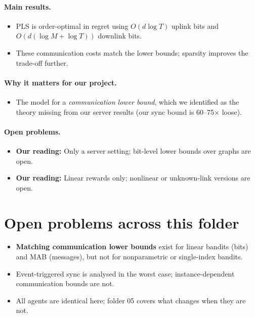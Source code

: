 \documentclass[11pt]{article}
\newcommand{\ours}{\textcolor{orange!80!black}{\textbf{Our reading:}}}
\begin{document}
\paragraph{Main results.}
\begin{itemize}\item PLS is order-optimal in regret using $O(d\log T)$ uplink bits and $O(d(\log M+\log T))$ downlink bits.\item These communication costs match the lower bounds; sparsity improves the trade-off further.\end{itemize}
\paragraph{Why it matters for our project.}
\begin{itemize}\item The model for a \emph{communication lower bound}, which we identified as the theory missing from our server results (our sync bound is 60--75$\times$ loose).\end{itemize}
\paragraph{Open problems.}
\begin{itemize}\item \ours{} Only a server setting; bit-level lower bounds over graphs are open.\item \ours{} Linear rewards only; nonlinear or unknown-link versions are open.\end{itemize}
\section{Open problems across this folder}
\begin{itemize}\item \textbf{Matching communication lower bounds} exist for linear bandits (bits) and MAB (messages), but not for nonparametric or single-index bandits.\item Event-triggered sync is analysed in the worst case; instance-dependent communication bounds are not.\item All agents are identical here; folder 05 covers what changes when they are not.\end{itemize}
\end{document}
